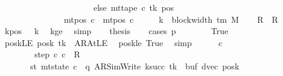 \begin{isabellebody}
\ \ \ \ \ \ \ \ \ \ \ \ \ \ \ \ \ \ \ \ \ \ else\ mt{\isacharunderscore}{\kern0pt}tape\ c{\isacharprime}{\kern0pt}\ tk\ pos{\isacharparenright}{\kern0pt}{\isacharparenright}{\kern0pt}{\isacharparenright}{\kern0pt}\isanewline
\ \ \ \ \ \ \ \ \ \ \ \ \ \ {\isasymand}\ mt{\isacharunderscore}{\kern0pt}pos\ c{\isacharprime}{\kern0pt}{\isacharprime}{\kern0pt}\ {\isacharequal}{\kern0pt}\ mt{\isacharunderscore}{\kern0pt}pos\ c{\isacharprime}{\kern0pt}{\isachardoublequoteclose}\isanewline
%
\isadelimproof
%
\endisadelimproof
%
\isatagproof
{}\isamarkupfalse%
\ {\isacharminus}{\kern0pt}\isanewline
\ \ \isamarkupfalse%
\ {\isacharquery}{\kern0pt}k\ {\isacharequal}{\kern0pt}\ {\isachardoublequoteopen}block{\isacharunderscore}{\kern0pt}width\ {\isacharparenleft}{\kern0pt}{\isasymGamma}{\isacharunderscore}{\kern0pt}tm\ M{\isacharparenright}{\kern0pt}{\isachardoublequoteclose}\isanewline
\ \ \isamarkupfalse%
\ {\isacharquery}{\kern0pt}R\ {\isacharequal}{\kern0pt}\ R{\isacharprime}{\kern0pt}\isanewline
\ \ \isamarkupfalse%
\ kpos{\isacharcolon}{\kern0pt}\ {\isachardoublequoteopen}{}\ {\isacharless}{\kern0pt}\ {\isacharquery}{\kern0pt}k{\isachardoublequoteclose}\ \isamarkupfalse%
\ kge{}\ \isamarkupfalse%
\ simp\isanewline
\ \ \isamarkupfalse%
\ {\isacharquery}{\kern0pt}thesis\isanewline
\ \ \isamarkupfalse%
\ {\isacharparenleft}{\kern0pt}cases\ {\isachardoublequoteopen}p\ {\isacharequal}{\kern0pt}\ {}{\isachardoublequoteclose}{\isacharparenright}{\kern0pt}\isanewline
\ \ \ \ \isamarkupfalse%
\ True\isanewline
\ \ \ \ \isamarkupfalse%
\ poskLE{\isacharcolon}{\kern0pt}\ {\isachardoublequoteopen}posk\ tk\ {\isacharequal}{\kern0pt}\ AR{\isacharunderscore}{\kern0pt}AtLE{\isachardoublequoteclose}\ \isamarkupfalse%
\ poskle\ True\ \isamarkupfalse%
\ simp\isanewline
\ \ \ \ \isamarkupfalse%
\ c{\isacharprime}{\kern0pt}{\isacharprime}{\kern0pt}\ \isanewline
\ \ \ \ \ \ \ \ step{\isacharcolon}{\kern0pt}\ {\isachardoublequoteopen}{\isacharparenleft}{\kern0pt}c{\isacharprime}{\kern0pt}{\isacharcomma}{\kern0pt}\ c{\isacharprime}{\kern0pt}{\isacharprime}{\kern0pt}{\isacharparenright}{\kern0pt}\ {\isasymin}\ {\isacharquery}{\kern0pt}R{\isachardoublequoteclose}\isanewline
\ \ \ \ \ \ \ st{\isacharcolon}{\kern0pt}\ {\isachardoublequoteopen}mt{\isacharunderscore}{\kern0pt}state\ c{\isacharprime}{\kern0pt}{\isacharprime}{\kern0pt}\ {\isacharequal}{\kern0pt}\ {\isacharparenleft}{\kern0pt}q{\isacharcomma}{\kern0pt}\ AR{\isacharunderscore}{\kern0pt}SimWrite{\isacharcomma}{\kern0pt}\ k{\isacharunderscore}{\kern0pt}succ\ tk{\isacharcomma}{\kern0pt}\ {}{\isacharcomma}{\kern0pt}\ buf{\isacharcomma}{\kern0pt}\ dvec{\isacharcomma}{\kern0pt}\ posk{\isacharparenright}{\kern0pt}{\isachardoublequoteclose}\isanewline

\end{isabellebody}
